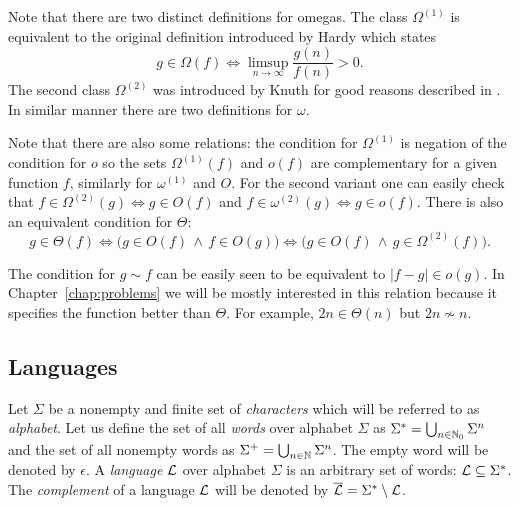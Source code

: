 		\begin{remark}
			Note that there are two distinct definitions for omegas. The class $\Omega^{(1)}$ is equivalent to the original definition introduced by Hardy \cite{hardy1914} which states
			\begin{equation*}
				g \in \Omega(f) \iff \limsup\limits_{n\to\infty}\frac{g(n)}{f(n)} > 0 .
			\end{equation*}
			The second class $\Omega^{(2)}$ was introduced by Knuth for good reasons described in \cite{knuth76}. In similar manner there are two definitions for $\omega$.
		\end{remark}
		\begin{remark}
			Note that there are also some relations: the condition for $\Omega^{(1)}$ is negation of the condition for $o$ so the sets $\Omega^{(1)}(f)$ and $o(f)$ are complementary for a given function $f$, similarly for $\omega^{(1)}$ and $O$. For the second variant one can easily check that $f\in\Omega^{(2)}(g)\iff g\in O(f)$ and $f\in\omega^{(2)}(g)\iff g\in o(f)$. There is also an equivalent condition for $\Theta$:
			\begin{equation*}
				g \in \Theta(f) \iff \bigl(g \in O(f) \,\wedge\, f \in O(g)\bigr) \iff \bigl(g \in O(f) \,\wedge\, g \in \Omega^{(2)}(f)\bigr) .
			\end{equation*}
		\end{remark}
		\begin{remark}
		\label{rem:tilde}
			The condition for $g \sim f$ can be easily seen to be equivalent to $|f-g| \in o(g)$. In Chapter~\ref{chap:problems} we will be mostly interested in this relation because it specifies the function better than $\Theta$. For example, $2n \in \Theta(n)$ but $2n \not\sim n$.
		\end{remark}
	
	\subsection{Languages}
		
		\begin{defn}
			Let $\Sigma$ be a nonempty and finite set of {\em characters} which will be referred to as {\em alphabet}. Let us define the set of all {\em words} over alphabet $\Sigma$ as $\Sigma^* = \bigcup_{n\in\mathbb{N}_0}\Sigma^n$ and the set of all nonempty words as $\Sigma^+ = \bigcup_{n\in\mathbb{N}}\Sigma^n$. The empty word will be denoted by $\epsilon$. A {\em language} ${\cal L}$ over alphabet $\Sigma$ is an arbitrary set of words: ${\cal L} \subseteq \Sigma^*$. The {\em complement} of a language $\cal L$ will be denoted by ${\cal\overline L} = \Sigma^* \setminus {\cal L}$.
		\end{defn}
		
